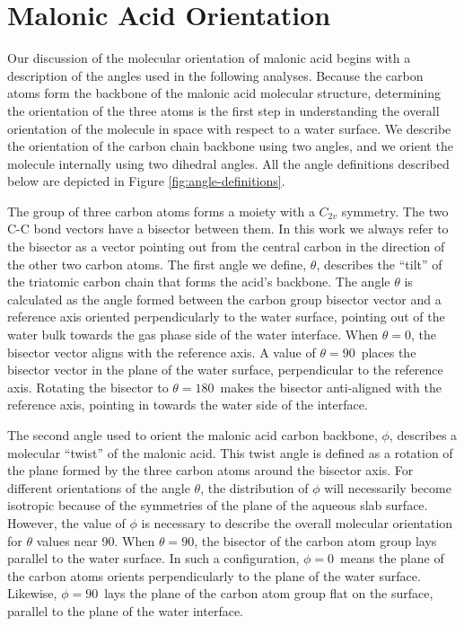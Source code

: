 \section{Malonic Acid Orientation}

Our discussion of the molecular orientation of malonic acid begins with a description of the angles used in the following analyses. Because the carbon atoms form the backbone of the malonic acid molecular structure, determining the orientation of the three atoms is the first step in understanding the overall orientation of the molecule in space with respect to a water surface.  We describe the orientation of the carbon chain backbone using two angles, and we orient the molecule internally using two dihedral angles.  All the angle definitions described below are depicted in Figure \ref{fig:angle-definitions}. 

The group of three carbon atoms forms a moiety with a $C_{2v}$ symmetry.  The two C-C bond vectors have a bisector between them.  In this work we always refer to the bisector as a vector pointing out from the central carbon in the direction of the other two carbon atoms.  The first angle we define, $\theta$, describes the ``tilt'' of the triatomic carbon chain that forms the acid's backbone. The angle $\theta$ is calculated as the angle formed between the carbon group bisector vector and a reference axis oriented perpendicularly to the water surface, pointing out of the water bulk towards the gas phase side of the water interface. When $\theta = 0$\textdegree, the bisector vector aligns with the reference axis. A value of $\theta=90$\textdegree~places the bisector vector in the plane of the water surface, perpendicular to the reference axis. Rotating the bisector to $\theta=180$\textdegree~makes the bisector anti-aligned with the reference axis, pointing in towards the water side of the interface.

The second angle used to orient the malonic acid carbon backbone, $\phi$, describes a molecular ``twist'' of the malonic acid. This twist angle is defined as a rotation of the plane formed by the three carbon atoms around the bisector axis. For different orientations of the angle $\theta$, the distribution of $\phi$ will necessarily become isotropic because of the symmetries of the plane of the aqueous slab surface. However, the value of $\phi$ is necessary to describe the overall molecular orientation for $\theta$ values near 90\textdegree. When $\theta = 90$\textdegree, the bisector of the carbon atom group lays parallel to the water surface. In such a configuration, $\phi = 0$\textdegree~means the plane of the carbon atoms orients perpendicularly to the plane of the water surface. Likewise, $\phi=90$\textdegree~lays the plane of the carbon atom group flat on the surface, parallel to the plane of the water interface.


